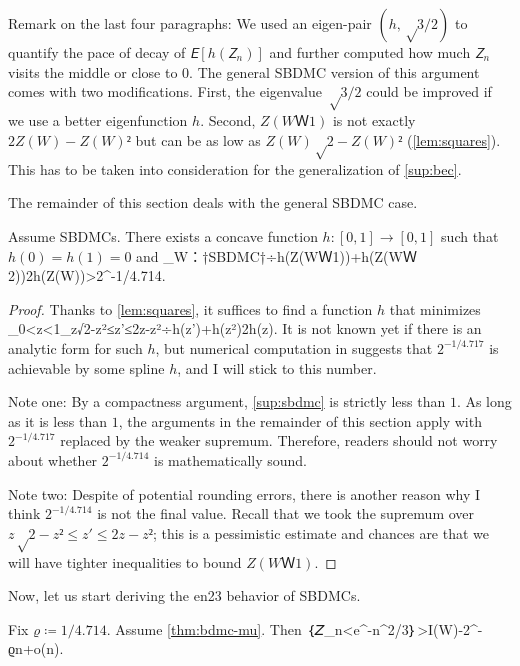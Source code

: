 \documentclass[openany]{amsbook}
\numberwithin{equation}{chapter}
\numberwithin{figure}{chapter}
\numberwithin{table}{chapter}
\def\[#1\]{\begin{equation*}{#1}\end{equation*}}
\theoremstyle{definition}	理dfn:Definition~?s			理exa:Example~?s
\theoremstyle{remark}		理cla:Claim~?s				理rem:Remark~?s
\def\tagcopy#1{\tag{\eqref{#1}'s copy}}
\begin{document}
	Remark on the last four paragraphs:
	We used an eigen-pair $(h,√3/2)$ to quantify the pace of decay of $𝘌[h(𝘡_n)]$
	and further computed how much $𝘡_n$ visits the middle or close to $0$.
	The general SBDMC version of this argument comes with two modifications.
	First, the eigenvalue $√3/2$ could be improved if we use a better eigenfunction $h$.
	Second, $Z(WＷ1)$ is not exactly $2Z(W)-Z(W)²$
	but can be as low as $Z(W)√{2-Z(W)²}$ (\cref{lem:squares}).
	This has to be taken into consideration
	for the generalization of \cref{sup:bec}.
	
	The remainder of this section deals with the general SBDMC case.
	
	\begin{thm}\label{thm:bdmc-mu}
		Assume SBDMCs.
		There exists a concave function $h:[0,1]→[0,1]$ such that $h(0)=h(1)=0$ and
		\[\sup_{W：†SBDMC†}÷{h(Z(WＷ1))+h(Z(WＷ2))}{2h(Z(W))}>2^{-1/4.714}.\]
	\end{thm}
	
	\begin{proof}
		Thanks to \cref{lem:squares}, it suffices to find a function $h$ that minimizes
		\[\sup_{0<z<1}\sup_{z√{2-z²}≤z'≤2z-z²}÷{h(z')+h(z²)}{2h(z)}.
			\label{sup:sbdmc}\]
		It is not known yet if there is an analytic form for such $h$, but
		numerical computation in \cite[Theorem~2]{MHU16} suggests that $2^{-1/4.717}$
		is achievable by some spline $h$, and I will stick to this number.
		
		Note one:
		By a compactness argument, \cref{sup:sbdmc} is strictly less than $1$.
		As long as it is less than $1$, the arguments in the remainder
		of this section apply with $2^{-1/4.717}$ replaced by the weaker supremum.
		Therefore, readers should not worry about
		whether $2^{-1/4.714}$ is mathematically sound.
		
		Note two:
		Despite of potential rounding errors, there is another reason
		why I think $2^{-1/4.714}$ is not the final value.
		Recall that we took the supremum over $z√{2-z²}≤z'≤2z-z²$;
		this is a pessimistic estimate and chances are that
		we will have tighter inequalities to bound $Z(WＷ1)$.
	\end{proof}
	
	Now, let us start deriving the en23 behavior of SBDMCs.
	
	\begin{lem}\label{lem:Z-en23}
		Fix $ϱ≔1/4.714$.
		Assume \cref{thm:bdmc-mu}.
		Then
		\[𝘗｛𝘡_n<e^{-n^{2/3}}｝>I(W)-2^{-ϱn+o(n)}.\tagcopy{ine:Z-en23}\]
	\end{lem}
	
\end{document}
